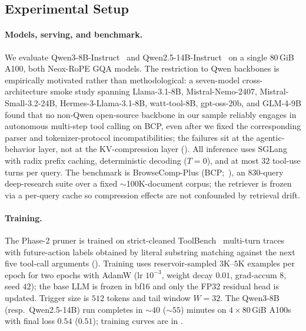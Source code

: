 \documentclass[11pt]{article}
\newcommand{\learn}{Phase-2\xspace}
\begin{document}
\subsection{Experimental Setup}
\label{sec:experiments-setup}

\paragraph{Models, serving, and benchmark.}
We evaluate Qwen3-8B-Instruct~\citep{yang2025qwen3} and
Qwen2.5-14B-Instruct~\citep{qwen2025qwen25technicalreport} on a single $80$\,GiB A100,
both Neox-RoPE GQA models. The restriction to Qwen backbones
is empirically motivated rather than methodological: a seven-model
cross-architecture smoke study spanning Llama-3.1-8B,
Mistral-Nemo-2407, Mistral-Small-3.2-24B, Hermes-3-Llama-3.1-8B,
watt-tool-8B, gpt-oss-20b, and GLM-4-9B found that no non-Qwen
open-source backbone in our sample reliably engages in autonomous
multi-step tool calling
on BCP, even after we fixed the corresponding parser and
tokenizer-protocol incompatibilities; the failures sit at the
agentic-behavior layer, not at the KV-compression layer
(). All inference uses
SGLang~\citep{zheng2024sglang} with radix prefix caching, deterministic
decoding ($T{=}0$), and at most $32$ tool-use turns per query.
The benchmark is BrowseComp-Plus (BCP;~\citealp{chen2025browsecomp}), an
$830$-query deep-research suite over a fixed $\sim$100K-document
corpus; the retriever is frozen via a per-query cache so compression
effects are not confounded by retrieval drift.

\paragraph{Training.}
The \learn pruner is trained on strict-cleaned ToolBench~%
\citep{qin2024toolllm,guo2024stabletoolbench} multi-turn traces with future-action
labels obtained by literal substring matching against the next five
tool-call arguments (). Training uses
reservoir-sampled $3$K--$5$K examples per epoch for two epochs with
AdamW (lr $10^{-3}$, weight decay $0.01$, grad-accum $8$, seed $42$);
the base LLM is frozen in bf16 and only the FP32 residual head is
updated. Trigger size is $512$ tokens and tail window $W{=}32$. The
Qwen3-8B (resp.\ Qwen2.5-14B) run completes in $\sim$$40$
($\sim$$55$) minutes on $4{\times}80$\,GiB A100s with final loss
$0.54$ ($0.51$); training curves are in
.
\end{document}
